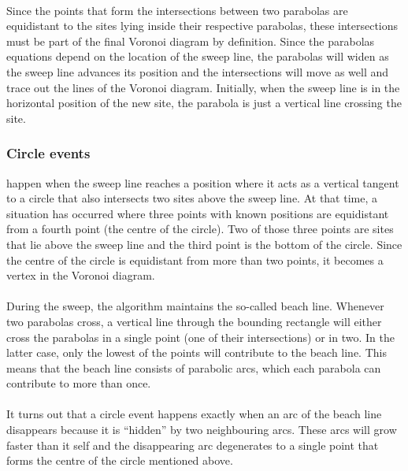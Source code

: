 \paragraph{}
Since the points that form the intersections between two parabolas are equidistant to the sites lying inside their respective parabolas, these intersections must be part of the final Voronoi diagram by definition. Since the parabolas equations depend on the location of the sweep line, the parabolas will widen as the sweep line advances its position and the intersections will move as well and trace out the lines of the Voronoi diagram. Initially, when the sweep line is in the horizontal position of the new site, the parabola is just a vertical line crossing the site.

\subsubsection{Circle events}
happen when the sweep line reaches a position where it acts as a vertical tangent to a circle that also intersects two sites above the sweep line. At that time, a situation has occurred where three points with known positions are equidistant from a fourth point (the centre of the circle). Two of those three points are sites that lie above the sweep line and the third point is the bottom of the circle. Since the centre of the circle is equidistant from more than two points, it becomes a vertex in the Voronoi diagram.

\paragraph{}
During the sweep, the algorithm maintains the so-called beach line. Whenever two parabolas cross, a vertical line through the bounding rectangle will either cross the parabolas in a single point (one of their intersections) or in two. In the latter case, only the lowest of the points will contribute to the beach line. This means that the beach line consists of parabolic arcs, which each parabola can contribute to more than once.

\paragraph{}
It turns out that a circle event happens exactly when an arc of the beach line disappears because it is “hidden” by two neighbouring arcs. These arcs will grow faster than it self and the disappearing arc degenerates to a single point that forms the centre of the circle mentioned above.

